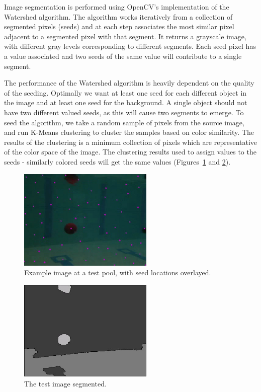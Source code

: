 Image segmentation is performed using OpenCV's implementation of the Watershed algorithm. The algorithm works iteratively from a collection of segmented pixels (seeds) and at each step associates the most similar pixel adjacent to a segmented pixel with that segment. It returns a grayscale image, with different gray levels corresponding to different segments. Each seed pixel has a value associated and two seeds of the same value will contribute to a single segment.

The performance of the Watershed algorithm is heavily dependent on the quality of the seeding. Optimally we want at least one seed for each different object in the image and at least one seed for the background. A single object should not have two different valued seeds, as this will cause two segments to emerge. To seed the algorithm, we take a random sample of pixels from the source image, and run K-Means clustering to cluster the samples based on color similarity. The results of the clustering is a minimum collection of pixels which are representative of the color space of the image. The clustering results used to assign values to the seeds - similarly colored seeds will get the same values (Figures~\ref{seed} and \ref{segment}).

\begin{figure}
\begin{center}
 \includegraphics[height=1.9in]{fig/seed_image.jpg}
\caption{Example image at a test pool, with seed locations overlayed.}\label{seed}
\end{center}
\end{figure}


\begin{figure}
\begin{center}
 \includegraphics[height=1.9in]{fig/segmented_image.jpg}
\caption{The test image segmented.}\label{segment}
\end{center}
\end{figure}


